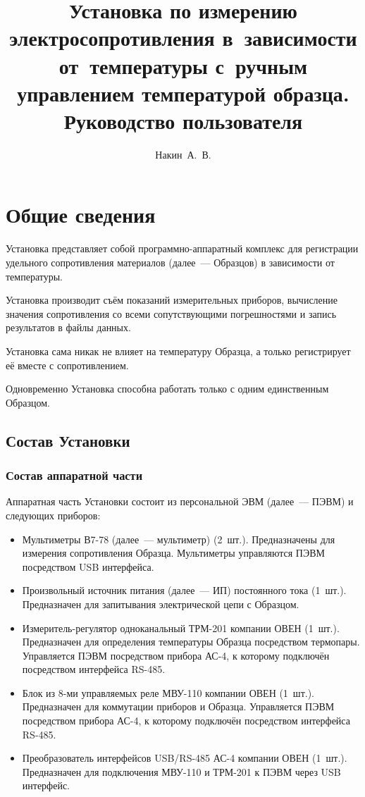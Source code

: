 \documentclass[12pt, a4paper, twocolumn]{report}
\title{Установка по измерению электросопротивления в~зависимости от~температуры с~ручным управлением температурой образца. \\ Руководство пользователя}
\author{Накин~А.~В.}
\begin{document}
\maketitle

\tableofcontents

\chapter{Общие сведения}

Установка представляет собой программно-аппаратный комплекс для регистрации удельного сопротивления материалов (далее~--- Образцов) в зависимости от температуры.

Установка производит съём показаний измерительных приборов, вычисление значения сопротивления со всеми сопутствующими погрешностями и запись результатов в файлы данных.

Установка сама никак не влияет на температуру Образца, а только регистрирует её вместе с сопротивлением.

Одновременно Установка способна работать только с одним единственным Образцом.

\section{Состав Установки}

\subsection{Состав аппаратной части}

Аппаратная часть Установки состоит из персональной ЭВМ (далее~--- ПЭВМ) и следующих приборов:

\begin{itemize}

\item Мультиметры В7-78 (далее~--- мультиметр) (2~шт.). Предназначены для измерения сопротивления Образца. Мультиметры управляются ПЭВМ посредством USB интерфейса.

\item Произвольный источник питания (далее~--- ИП) постоянного тока (1~шт.). Предназначен для запитывания электрической цепи с Образцом.

\item Измеритель-регулятор одноканальный ТРМ-201 компании ОВЕН (1~шт.). Предназначен для определения температуры Образца посредством термопары. Управляется ПЭВМ посредством прибора АС-4, к которому подключён посредством интерфейса RS-485.

\item Блок из 8-ми управляемых реле МВУ-110 компании ОВЕН (1~шт.). Предназначен для коммутации приборов и Образца. Управляется ПЭВМ посредством прибора АС-4, к которому подключён посредством интерфейса RS-485.

\item Преобразователь интерфейсов USB/RS-485 АС-4 компании ОВЕН (1~шт.). Предназначен для подключения МВУ-110 и ТРМ-201 к ПЭВМ через USB интерфейс.

\end{itemize}
\end{document}
